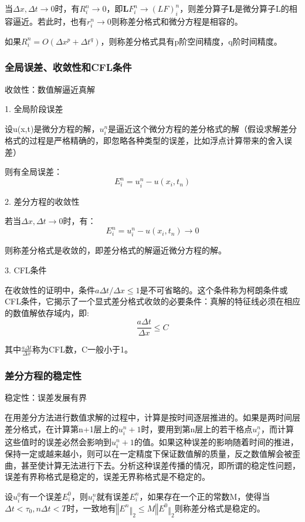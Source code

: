 \documentclass{article}
\begin{document}
当$\Delta x, \Delta t \longrightarrow 0$时，有$R_i^n\longrightarrow0$，即$\mathbf{L}F_i^n\longrightarrow(LF)_i^n$，则差分算子$\mathbf{L}$是微分算子L的相容逼近。若此时，也有$r_i^n\longrightarrow0$则称差分格式和微分方程是相容的。

如果$R_i^n=O(\Delta x^p + \Delta t^q)$，则称差分格式具有p阶空间精度，q阶时间精度。

\subsubsection{全局误差、收敛性和CFL条件}
收敛性：数值解逼近真解

1. 全局阶段误差

设u(x,t)是微分方程的解，$u_i^n$是逼近这个微分方程的差分格式的解（假设求解差分格式的过程是严格精确的，即忽略各种类型的误差，比如浮点计算带来的舍入误差）

则有全局误差：
$$E_i^n = u^n_i - u(x_i, t_n)$$

2. 差分方程的收敛性

若当$\Delta x,\Delta t\longrightarrow0$时，有：
$$E_i^n = u^n_i - u(x_i, t_n)\longrightarrow0$$

则称差分格式是收敛的，即差分格式的解逼近微分方程的解。

3. CFL条件

在收敛性的证明中，条件$a\Delta t/\Delta x\le1$是不可省略的。这个条件称为柯朗条件或CFL条件，它揭示了一个显式差分格式收敛的必要条件：真解的特征线必须在相应的数值解依存域内，即:
$$\frac{a\Delta t}{\Delta x}\le C$$

其中$\frac{a\Delta t}{\Delta x}$称为CFL数，C一般小于1。

\subsubsection{差分方程的稳定性}
稳定性：误差发展有界

在用差分方法进行数值求解的过程中，计算是按时间逐层推进的。如果是两时间层差分格式，在计算第n+1层上的$u_i^n+1$时，要用到第n层上的若干格点$u_j^n$，而计算这些值时的误差必然会影响到$u_i^n+1$的值。如果这种误差的影响随着时间的推进，保持一定或越来越小，则可以在一定精度下保证数值解的质量，反之数值解会被歪曲，甚至使计算无法进行下去。分析这种误差传播的情况，即所谓的稳定性问题，误差有界称格式是稳定的，误差无界称格式是不稳定的。

设$u_i^0$有一个误差$E_i^0$，则$u_i^n$就有误差$E_i^n$，如果存在一个正的常数M，使得当$\Delta t<\tau_0, n\Delta t<T$时，一致地有$‖E^n‖_2\le M‖E^0‖_2$则称差分格式是稳定的。
\end{document}
